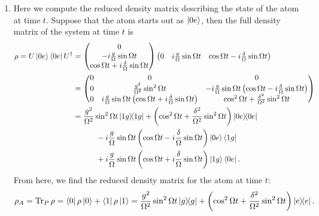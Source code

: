 \documentclass{article}
\theoremstyle{definition}
\newcommand{\f}[2]{\frac{#1}{#2}}
\newcommand{\lp}{\left(}
\newcommand{\rp}{\right)}
\begin{document}
\begin{enumerate}[label=(\alph*)]
\item Here we compute the reduced density matrix describing the state of the atom at time $t$. Suppose that the atom starts out as $\ket{0e}$, then the full density matrix of the system at time $t$ is 
\begin{align*}
\rho = U \ket{0e} \bra{0e} U^\dagger &= 
\begin{pmatrix}
0  \\ -i \f{g}{\Omega} \sin \Omega t \\ \cos \Omega t + i \f{\delta}{\Omega} \sin \Omega t 
\end{pmatrix}
\begin{pmatrix}
0 &  i \f{g}{\Omega}\sin \Omega t & \cos \Omega t - i \f{\delta}{\Omega} \sin \Omega t 
\end{pmatrix} \\ 
&=
\begin{pmatrix}
0 & 0 & 0 \\
0 & \f{g^2}{\Omega^2} \sin^2 \Omega t & -i \f{g}{\Omega} \sin\Omega t \lp \cos \Omega t - i \f{\delta}{\Omega} \sin \Omega t  \rp \\
0 & i \f{g}{\Omega} \sin \Omega t \lp \cos \Omega t + i \f{\delta}{\Omega} \sin \Omega t \rp & \cos^2\Omega t + \f{\delta^2}{\Omega^2}\sin^2 \Omega t 
\end{pmatrix} \\ 
&=  \f{g^2}{\Omega^2} \sin^2 \Omega t \ketbra{1g} + \lp \cos^2\Omega t + \f{\delta^2}{\Omega^2}\sin^2 \Omega t   \rp \ketbra{0e} \\
& \quad\quad\quad -i \f{g}{\Omega} \sin\Omega t \lp \cos \Omega t - i \f{\delta}{\Omega} \sin \Omega t  \rp \ket{0e}\bra{1g} \\
& \quad\quad\quad +   i \f{g}{\Omega} \sin \Omega t \lp \cos \Omega t + i \f{\delta}{\Omega} \sin \Omega t \rp \ket{1g}\bra{0e}.
\end{align*}
From here, we find the reduced density matrix for the atom at time $t$: 
\begin{align*}
\rho_A = \Tr_P \rho = \bra{0} \rho \ket{0} + \bra{1} \rho \ket{1} =   \f{g^2}{\Omega^2} \sin^2 \Omega t \ketbra{g} + \lp \cos^2\Omega t + \f{\delta^2}{\Omega^2}\sin^2 \Omega t   \rp   \ketbra{e}.
\end{align*}







\end{enumerate}
\end{document}
